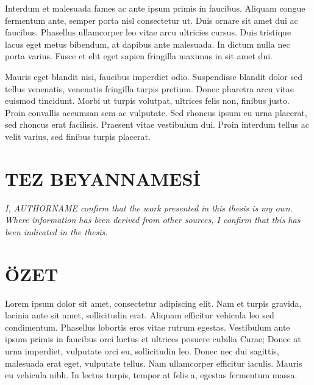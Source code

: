 \documentclass[12pt,turkish,a4paperpaper,]{report}
\begin{document}
Interdum et malesuada fames ac ante ipsum primis in faucibus. Aliquam
congue fermentum ante, semper porta nisl consectetur ut. Duis ornare sit
amet dui ac faucibus. Phasellus ullamcorper leo vitae arcu ultricies
cursus. Duis tristique lacus eget metus bibendum, at dapibus ante
malesuada. In dictum nulla nec porta varius. Fusce et elit eget sapien
fringilla maximus in sit amet dui.

Mauris eget blandit nisi, faucibus imperdiet odio. Suspendisse blandit
dolor sed tellus venenatis, venenatis fringilla turpis pretium. Donec
pharetra arcu vitae euismod tincidunt. Morbi ut turpis volutpat,
ultrices felis non, finibus justo. Proin convallis accumsan sem ac
vulputate. Sed rhoncus ipsum eu urna placerat, sed rhoncus erat
facilisis. Praesent vitae vestibulum dui. Proin interdum tellus ac velit
varius, sed finibus turpis placerat.

\hypertarget{tez-beyannamesi}{%
\chapter*{TEZ BEYANNAMESİ}\label{tez-beyannamesi}}

\vspace*{\fill}

\noindent \textit{
I, AUTHORNAME confirm that the work presented in this thesis is my own. Where information has been derived from other sources, I confirm that this has been indicated in the thesis.
} \vspace*{\fill}

\newpage{}\tableofcontents{}

\hypertarget{uxf6zet}{%
\chapter*{ÖZET}\label{uxf6zet}}

Lorem ipsum dolor sit amet, consectetur adipiscing elit. Nam et turpis
gravida, lacinia ante sit amet, sollicitudin erat. Aliquam efficitur
vehicula leo sed condimentum. Phasellus lobortis eros vitae rutrum
egestas. Vestibulum ante ipsum primis in faucibus orci luctus et
ultrices posuere cubilia Curae; Donec at urna imperdiet, vulputate orci
eu, sollicitudin leo. Donec nec dui sagittis, malesuada erat eget,
vulputate tellus. Nam ullamcorper efficitur iaculis. Mauris eu vehicula
nibh. In lectus turpis, tempor at felis a, egestas fermentum massa.
\end{document}
